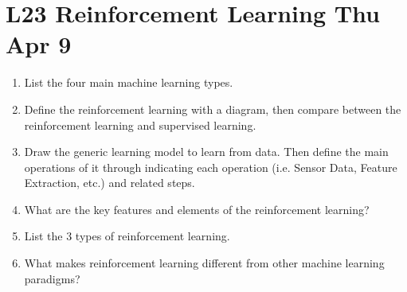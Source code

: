 \documentclass[12pt]{article}
\newenvironment{QandA}{\begin{enumerate}[label=\bfseries\arabic*.]\bfseries}
{\end{enumerate}}
\newenvironment{answered}{\par\normalfont\color{Sepia}}{}
\begin{document}
\section*{L23 Reinforcement Learning \textemdash{} Thu Apr 9}
\begin{QandA}
    \item List the four main machine learning types. 
    \begin{answered}
    \end{answered}

    \item Define the reinforcement learning with a diagram, then compare between the 
          reinforcement learning and supervised learning.
    \begin{answered}
    \end{answered}
      
    \item Draw the generic learning model to learn from data. Then define the main operations of 
          it through indicating each operation (i.e. Sensor Data, Feature Extraction, etc.) and 
          related steps.
    \begin{answered}
    \end{answered}
      
    \item What are the key features and elements of the reinforcement learning?
    \begin{answered}
    \end{answered}

    \item List the 3 types of reinforcement learning.
    \begin{answered}
    \end{answered}

    \item What makes reinforcement learning different from other machine learning paradigms?
    \begin{answered}
    \end{answered}

\end{QandA}
\end{document}
